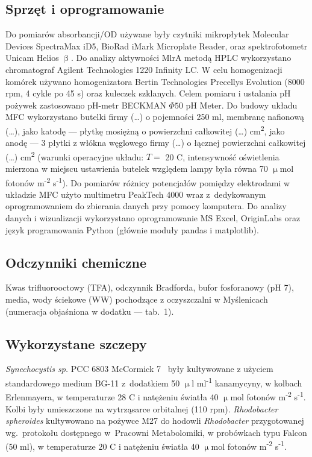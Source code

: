 \subsection{Sprzęt i oprogramowanie}\label{subsec:sprzet}
Do pomiarów absorbancji/OD używane były czytniki mikropłytek
Molecular Devices SpectraMax iD5, BioRad iMark
Microplate Reader, oraz spektrofotometr Unicam Helios $\upbeta$.
Do analizy aktywności MlrA metodą HPLC wykorzystano chromatograf
Agilent Technologies 1220 Infinity LC\@.
W celu homogenizacji komórek używano homogenizatora
Bertin Technologies Precellys Evolution (8000 rpm, 4 cykle po 45 s)
oraz kuleczek szklanych.
Celem pomiaru i ustalania pH pożywek zastosowano pH-metr
BECKMAN $\Phi 50$ pH Meter.
Do budowy układu MFC wykorzystano butelki firmy (\ldots)
o pojemności 250 ml, membranę nafionową (\ldots),
jako katodę — płytkę mosiężną o powierzchni całkowitej (\ldots)
cm\textsuperscript{2}, jako anodę — 3 płytki z włókna węglowego firmy
(\ldots) o łącznej powierzchni całkowitej (\ldots) cm\textsuperscript{2}
(warunki operacyjne układu:
$T =$ 20 \degree C, intensywność oświetlenia mierzona w miejscu
ustawienia butelek względem lampy była równa
70 $\upmu$mol fotonów m\textsuperscript{-2} s\textsuperscript{-1}).
Do pomiarów różnicy potencjałów pomiędzy elektrodami
w układzie MFC użyto multimetru PeakTech 4000 wraz
z~dedykowanym oprogramowaniem do zbierania danych przy pomocy komputera.
Do analizy danych i wizualizacji wykorzystano oprogramowanie
MS Excel, OriginLabs oraz język programowania Python
(głównie moduły pandas i matplotlib).

\subsection{Odczynniki chemiczne}\label{subsec:odczynniki}
Kwas trifluorooctowy (TFA), odczynnik Bradforda, bufor fosforanowy (pH 7),
media, wody ściekowe (WW) pochodzące z oczyszczalni w Myślenicach
(numeracja objaśniona w dodatku — tab.\ 1).

\subsection{Wykorzystane szczepy}\label{subsec:szczepy}
\textit{Synechocystis sp.} PCC 6803 McCormick 7~\cite{Puchalski2021}
były kultywowane z użyciem standardowego medium BG-11 z~dodatkiem 50
$\upmu$l ml\textsuperscript{-1} kanamycyny, w kolbach Erlenmayera,
w temperaturze 28 \degree C i natężeniu światła
40 $\upmu$mol fotonów m\textsuperscript{-2} s\textsuperscript{-1}.
Kolbi były umieszczone na wytrząsarce orbitalnej (110 rpm).
\textit{Rhodobacter spheroides} kultywowano na pożywce M27
do hodowli \textit{Rhodobacter} przygotowanej wg.\ protokołu
dostępnego w~Pracowni Metabolomiki, w probówkach typu
Falcon (50 ml), w temperaturze 20 \degree C i natężeniu światła
40 $\upmu$mol fotonów m\textsuperscript{-2} s\textsuperscript{-1}.

